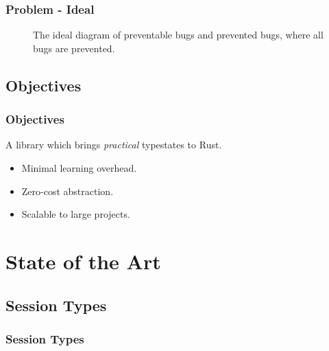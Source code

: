 \documentclass[bigger,notes]{beamer}
\begin{document}
\begin{frame}
    \frametitle{Problem - Ideal}
    \begin{figure}
        \centering
        \caption{The ideal diagram of preventable bugs and prevented bugs, where all bugs are prevented.}
    \end{figure}
\end{frame}

\subsection{Objectives}
\begin{frame}
    \frametitle{Objectives}

    A library which brings \emph{practical} typestates to Rust.
    \begin{itemize}
        \item Minimal learning overhead.
        \item Zero-cost abstraction.
        \item Scalable to large projects.
    \end{itemize}


\end{frame}

\section{State of the Art}
\subsection{Session Types}
\begin{frame}
    \frametitle{Session Types}

\end{frame}
\end{document}

